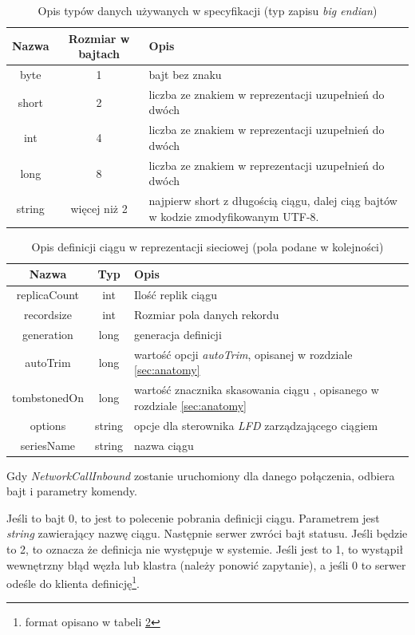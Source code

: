 \documentclass[a4paper,polish,12pt,twoside]{article}
\begin{document}
\begin{table} \centering \begin{tabular}{|c|c|p{8cm}|}
\hline Nazwa & Rozmiar w bajtach & Opis \\ \hline
byte & 1 & bajt bez znaku \\
short & 2 & liczba ze znakiem w reprezentacji uzupełnień do dwóch\\
int & 4 & liczba ze znakiem w reprezentacji uzupełnień do dwóch\\
long & 8 & liczba ze znakiem w reprezentacji uzupełnień do dwóch\\
string & więcej niż 2 & najpierw short z długością ciągu, dalej ciąg bajtów w kodzie zmodyfikowanym UTF-8. \\
\hline \end{tabular}
\caption{Opis typów danych używanych w specyfikacji (typ zapisu \textit{big endian})} \label{tab:datatypes} \end{table}

\begin{table} \centering \begin{tabular}{|c|c|p{8cm}|}
\hline Nazwa & Typ & Opis \\ \hline
replicaCount & int & Ilość replik ciągu \\
recordsize & int & Rozmiar pola danych rekordu \\
generation & long & generacja definicji \\
autoTrim & long & wartość opcji \textit{autoTrim}, opisanej w rozdziale \ref{sec:anatomy} \\
tombstonedOn & long & wartość znacznika skasowania ciągu , opisanego w rozdziale \ref{sec:anatomy} \\
options & string & opcje dla sterownika \textit{LFD} zarządzającego ciągiem \\
seriesName & string & nazwa ciągu \\
\hline \end{tabular}
\caption{Opis definicji ciągu w reprezentacji sieciowej (pola podane w kolejności)} \label{tab:intp} \end{table}

Gdy \textit{NetworkCallInbound} zostanie uruchomiony dla danego połączenia, odbiera bajt i parametry komendy.

Jeśli to bajt 0, to jest to polecenie pobrania definicji ciągu. Parametrem jest \textit{string} zawierający nazwę ciągu. Następnie serwer zwróci bajt statusu. Jeśli będzie to 2, to oznacza że definicja nie występuje w systemie. Jeśli jest to 1, to wystąpił wewnętrzny błąd węzła lub klastra (należy ponowić zapytanie), a jeśli 0 to serwer odeśle do klienta definicję\footnote{format opisano w tabeli \ref{tab:intp}}.
\end{document}
